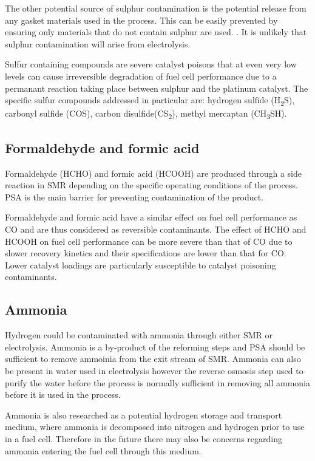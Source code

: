 The other potential source of sulphur contamination is the potential release from any gasket materials used in the process. This can be easily prevented by ensuring only materials that do not contain sulphur are used. \cite{InternationalStandardISO14687-2:20122012}. It is unlikely that sulphur contamination will arise from electrolysis. 

Sulfur containing compounds are severe catalyst poisons that at even very low levels can cause irreversible degradation of fuel cell performance due to a permanant reaction taking place between sulphur and the platinum catalyst. The specific sulfur compounds addressed in particular are: hydrogen sulfide (H\textsubscript{2}S), carbonyl sulfide (COS), carbon disulfide(CS\textsubscript{2}), methyl mercaptan (CH\textsubscript{3}SH). \cite{InternationalStandardISO14687-2:20122012} 

\subsection*{Formaldehyde and formic acid}
Formaldehyde (HCHO) and formic acid (HCOOH) are produced through a side reaction in SMR depending on the specific operating conditions of the process.\cite{Muradov2015} PSA is the main barrier for preventing contamination of the product. \cite{Bacquart2018}

Formaldehyde and formic acid have a similar effect on fuel cell performance as CO and are thus considered as reversible contaminants. The effect of HCHO and HCOOH on fuel cell performance can be more severe than that of CO due to slower recovery kinetics and their specifications are lower than that for CO. \cite{InternationalStandardISO14687-2:20122012} Lower catalyst loadings are particularly susceptible to catalyst poisoning contaminants.

\subsection*{Ammonia}
Hydrogen could be contaminated with ammonia through either SMR or electrolysis. Ammonia is a by-product of the reforming steps and PSA should be sufficient to remove ammoinia from the exit stream of SMR. Ammonia can also be present in water used in electrolysis however the reverse osmosis step used to purify the water before the process is normally sufficient in removing all ammonia before it is used in the process. \cite{Bacquart2018}

Ammonia is also researched as a potential hydrogen storage and transport medium, where ammonia is decomposed into nitrogen and hydrogen prior to use in a fuel cell. \cite{LAMB20193580} Therefore in the future there may also be concerns regarding ammonia entering the fuel cell through this medium.

